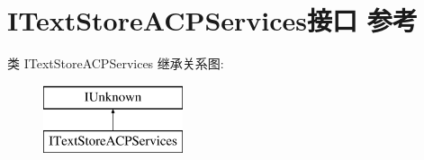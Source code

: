 \hypertarget{interface_i_text_store_a_c_p_services}{}\section{I\+Text\+Store\+A\+C\+P\+Services接口 参考}
\label{interface_i_text_store_a_c_p_services}
类 I\+Text\+Store\+A\+C\+P\+Services 继承关系图\+:\begin{figure}[H]
\begin{center}
\leavevmode
\includegraphics[height=2.000000cm]{interface_i_text_store_a_c_p_services}
\end{center}
\end{figure}
